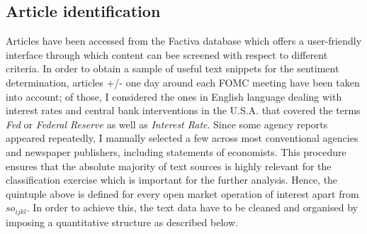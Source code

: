 \subsection{Article identification}\label{subsec:ArticleID}

Articles have been accessed from the Factiva database which offers a user-friendly interface through which content can bee screened with respect to different criteria. In order to obtain a sample of useful text snippets for the sentiment determination, articles +/- one day around each FOMC meeting have been taken into account; of those, I considered the ones in English language dealing with interest rates and central bank interventions in the U.S.A. that covered the terms \textit{Fed} or \textit{Federal Reserve} as well as \textit{Interest Rate}. Since some agency reports appeared repeatedly, I manually selected a few across most conventional agencies and newspaper publishers, including statements of economists. This procedure ensures that the absolute majority of text sources is highly relevant for the classification exercise which is important for the further analysis. Hence, the quintuple above is defined for every open market operation of interest apart from $so_{ijkl}$. In order to achieve this, the text data have to be cleaned and organised by imposing a quantitative structure as described below.
%
%

